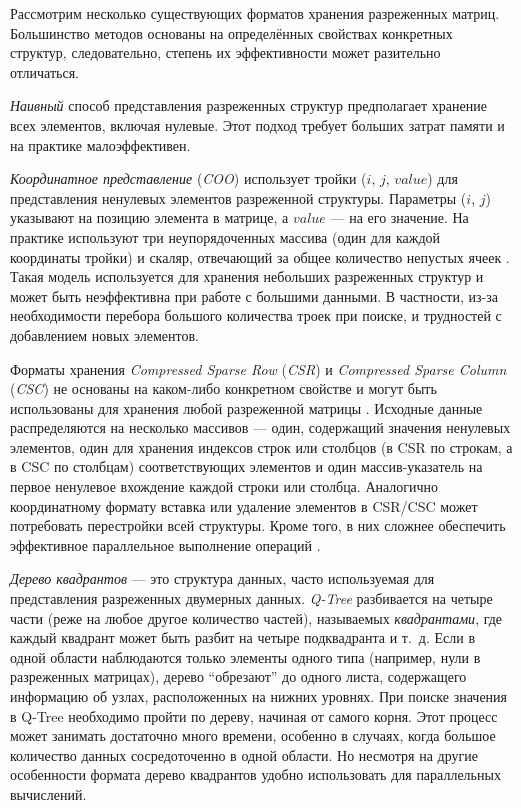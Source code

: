 Рассмотрим несколько существующих форматов хранения разре\-жен\-ных матриц. Большинство методов основаны на определённых свойствах конкретных структур, следовательно, степень их эффективности может разительно отличаться. 

\textit{Наивный} способ представления разреженных структур предполагает хранение всех элементов, включая нулевые. Этот подход требует больших затрат памяти и на практике малоэффективен.

\textit{Координатное представление} (\textit{COO}) использует тройки ($i$, $j$, $value$) для представления ненулевых элементов разреженной структуры. Параметры ($i$, $j$) указывают на позицию элемента в матрице, а $value$ --- на его значение. На практике используют три неупорядоченных массива (один для каждой координаты тройки) и скаляр, отвечающий за общее количество непустых ячеек \cite{stanimirovic2009performance}. Такая модель используется для хранения небольших разреженных структур и может быть неэффективна при работе с большими данными. В частности, из-за необходимости перебора большого количества троек при поиске, и трудностей с добавлением новых элементов.

Форматы хранения \textit{Compressed Sparse Row} (\textit{CSR}) и \textit{Compressed Spar\-se Column} (\textit{CSC}) не основаны на каком-либо конкретном свойстве
и могут быть использованы для хранения любой разреженной матрицы \cite{stanimirovic2009performance}. Исходные данные распределяются на несколько массивов --- один, содержащий значения ненулевых элементов, один для хранения индексов строк или столбцов (в CSR по строкам, а в CSC по столбцам) соответствующих элементов и один массив-указатель на первое ненулевое вхождение каждой строки или столбца. Аналогично координатному формату вставка или удаление элементов в CSR/CSC может потребовать перестройки всей структуры. Кроме того, в них сложнее обеспечить эффективное параллельное выполнение операций \cite{bulucc2009parallel}.

\textit{Дерево квадрантов} --- это структура данных, часто используемая для представления разреженных двумерных данных. \textit{Q-Tree} разбивается на четыре части (реже на любое другое количество частей), называемых \textit{квадрантами}, где каждый квадрант может быть разбит на четыре подквадранта и т.~д. Если в одной области наблюдаются только элементы одного типа (например, нули в разреженных матрицах), дерево \enquote{обрезают} до одного листа, содержащего информацию об узлах, расположенных на нижних уровнях. При поиске значения в Q-Tree необходимо пройти по дереву, начиная от самого корня. Этот процесс может занимать достаточно много времени, особенно в случаях, когда большое количество данных сосредоточенно в одной области. Но несмотря на другие особенности формата дерево квадрантов удобно использовать для параллельных вычислений.

